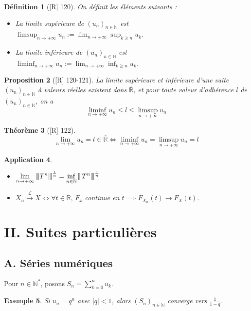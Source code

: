 \documentclass[10pt, a4paper, parskip=full, twoside, twocolumn]{report}
\newtheorem{definition}{Définition}
\newtheorem{theorem}[definition]{Théorème}
\newtheorem{proposition}[definition]{Proposition}
\newtheorem{example}[definition]{Exemple}
\newtheorem{application}[definition]{Application}
\newcommand{\IN}{\mathbb{N}}
\newcommand{\IR}{\mathbb{R}}
\newcommand{\vertiii}[1]{{\left\vert\kern-0.25ex\left\vert\kern-0.25ex\left\vert #1 
    \right\vert\kern-0.25ex\right\vert\kern-0.25ex\right\vert}}
\begin{document}
\begin{definition}[\textnormal{[R] 120}]
	On définit les éléments suivants :
	\begin{itemize}
		\item La \emph{limite supérieure de $\left(u_n\right)_{n\in\IN}$} est $\displaystyle{\limsup_{n\to +\infty} u_n := \lim_{n\to +\infty} \sup_{k\geq n} u_k}$.
		\item La \emph{limite inférieure de $\left(u_n\right)_{n\in\IN}$} est $\displaystyle{\liminf_{n\to +\infty} u_n := \lim_{n\to +\infty} \inf_{k\geq n} u_k}$.
	\end{itemize}
\end{definition}

\begin{proposition}[\textnormal{[R] 120-121}]
	La limite supérieure et inférieure d'une suite $\left(u_n\right)_{n\in\IN}$ à valeurs réelles existent dans $\overline{\IR}$, et pour 
	toute valeur d'adhérence $l$ de $\left(u_n\right)_{n\in\IN}$, on a 
	$$\liminf_{n\to +\infty} u_n \leq l \leq \limsup_{n\to +\infty} u_n$$
\end{proposition}

\begin{theorem}[\textnormal{[R] 122}]
	$$\lim_{n\to +\infty} u_n = l\in\overline{\IR} \iff \liminf_{n\to +\infty} u_n = \limsup_{n\to +\infty} u_n = l$$
\end{theorem}

\begin{application}
	\begin{itemize}
		\item $\displaystyle{\lim_{n\to +\infty} \vertiii{T^n}^{\frac{1}{n}} = \inf_{n\in\IN} \vertiii{T^n}^{\frac{1}{n}}}$
		\item $X_n \xrightarrow{\mathcal{L}} X \iff \forall t\in\IR,\, F_x$ continue en $t\implies F_{X_n}(t)\to F_X(t)$.
	\end{itemize}
\end{application}

\section*{II. Suites particulières}
\subsection{A. Séries numériques}
\textcolor{paragraphtext}{Pour $n\in\IN^*$, posons $S_n = \sum_{k=0}^{n} u_k$.}

\begin{example}
	Si $u_n = q^n$ avec $\vert q\vert < 1$, alors $\left(S_n\right)_{n\in\IN}$ converge vers $\frac{1}{1-q}$.
\end{example}
\end{document}

